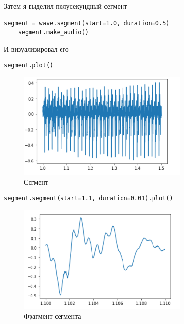 \documentclass[a4paper,12pt]{article}
\begin{document}
\begin{enumerate}
Затем я выделил полусекундный сегмент
\begin{lstlisting}[caption=Сегмент и его прослушивание]
	segment = wave.segment(start=1.0, duration=0.5)
	segment.make_audio()
\end{lstlisting}

И визуализировал его
\begin{lstlisting}[caption=Визуализация сегмента]
	segment.plot()
\end{lstlisting}

\begin{figure}[H]
	\centering
	\includegraphics[width=0.75\textwidth]{2_2.png}
	\caption{Сегмент}
	\label{fig:2.2}
\end{figure}

\begin{lstlisting}[caption=Фрагмент сегмента]
	segment.segment(start=1.1, duration=0.01).plot()
\end{lstlisting}

\begin{figure}[H]
	\centering
	\includegraphics[width=0.75\textwidth]{2_3.png}
	\caption{Фрагмент сегмента}
	\label{fig:2.3}
\end{figure}


\end{enumerate}
\end{document}

